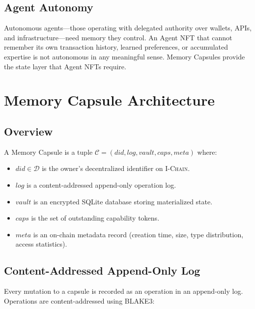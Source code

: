 \documentclass[11pt,letterpaper]{article}
\theoremstyle{definition}
\theoremstyle{remark}
\newcommand{\IChain}{\textsc{I-Chain}}
\begin{document}
\subsection{Agent Autonomy}

Autonomous agents---those operating with delegated authority over wallets, APIs, and infrastructure---need memory they control. An Agent NFT \cite{zoo-agent-nft} that cannot remember its own transaction history, learned preferences, or accumulated expertise is not autonomous in any meaningful sense. Memory Capsules provide the state layer that Agent NFTs require.

\section{Memory Capsule Architecture}
\label{sec:architecture}

\subsection{Overview}

A Memory Capsule is a tuple $\mathcal{C} = (\textit{did}, \textit{log}, \textit{vault}, \textit{caps}, \textit{meta})$ where:

\begin{itemize}
    \item $\textit{did} \in \mathcal{D}$ is the owner's decentralized identifier on \IChain{}.
    \item $\textit{log}$ is a content-addressed append-only operation log.
    \item $\textit{vault}$ is an encrypted SQLite database storing materialized state.
    \item $\textit{caps}$ is the set of outstanding capability tokens.
    \item $\textit{meta}$ is an on-chain metadata record (creation time, size, type distribution, access statistics).
\end{itemize}

\subsection{Content-Addressed Append-Only Log}

Every mutation to a capsule is recorded as an operation in an append-only log. Operations are content-addressed using BLAKE3:
\end{document}
